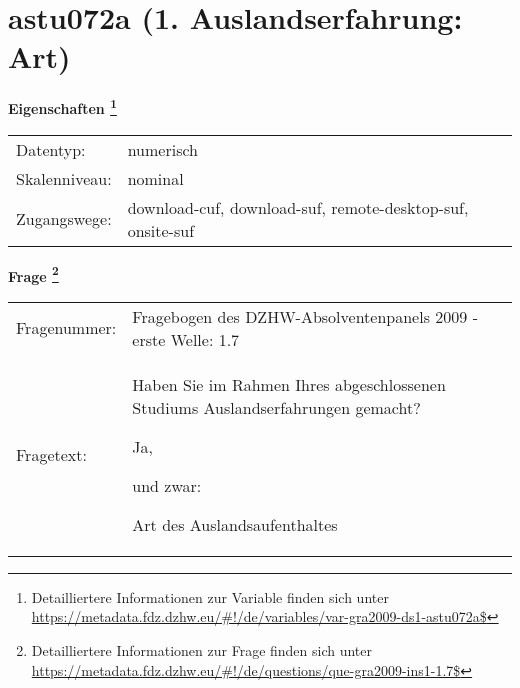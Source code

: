 
    \setcounter{footnote}{0}

    \vspace*{-1.8cm}
	\section{astu072a (1. Auslandserfahrung: Art)}
	\label{section:astu072a}



    \vspace*{0.5cm}
    \noindent\textbf{Eigenschaften
	\footnote{Detailliertere Informationen zur Variable finden sich unter
		\url{https://metadata.fdz.dzhw.eu/\#!/de/variables/var-gra2009-ds1-astu072a$}}}\\
	\begin{tabularx}{\hsize}{@{}lX}
	Datentyp: & numerisch \\
	Skalenniveau: & nominal \\
	Zugangswege: &
	  download-cuf, 
	  download-suf, 
	  remote-desktop-suf, 
	  onsite-suf
 \\
    \end{tabularx}



				\vspace*{0.5cm}
                \noindent\textbf{Frage
	                \footnote{Detailliertere Informationen zur Frage finden sich unter
		              \url{https://metadata.fdz.dzhw.eu/\#!/de/questions/que-gra2009-ins1-1.7$}}}\\
				\begin{tabularx}{\hsize}{@{}lX}
					Fragenummer: &
					  Fragebogen des DZHW-Absolventenpanels 2009 - erste Welle:
					  1.7
 \\
					Fragetext: & Haben Sie im Rahmen Ihres abgeschlossenen Studiums Auslandserfahrungen gemacht?\par  Ja,\par  und zwar:\par  Art des Auslandsaufenthaltes \\
				\end{tabularx}





